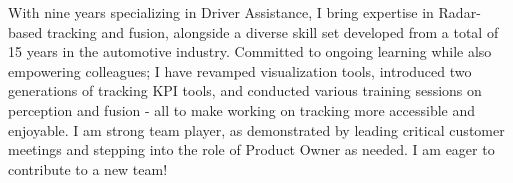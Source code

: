 

\begin{cvparagraph}
    With nine years specializing in Driver Assistance, I bring expertise in Radar-based
    tracking and fusion, alongside a diverse skill set developed from a total of 15 years in the automotive industry.
    Committed to ongoing learning while also empowering colleagues; I have revamped visualization tools, introduced two generations of tracking KPI tools, and conducted various training sessions on perception and fusion - all to make working on tracking more accessible and enjoyable. I am strong team player, as demonstrated by leading critical customer meetings and stepping into the role of Product Owner as needed. I am eager to contribute to a new team!

\end{cvparagraph}
